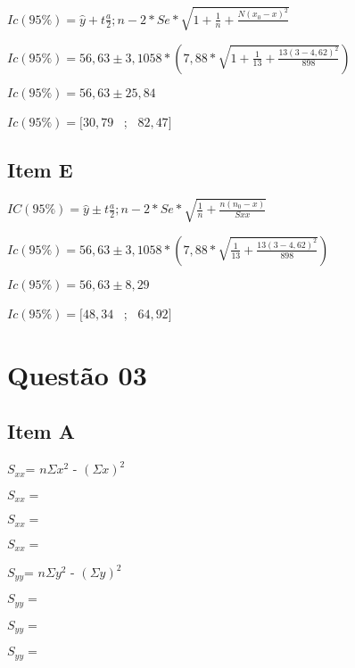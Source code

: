 \documentclass{article}
\begin{document}
            \begin{flushleft}
            $Ic(95\%) = \hat{y} + t\frac{a}{2};n-2 *Se* \sqrt{1 + \frac{1}{n} +\frac{N(x_0 -x)^2}{}}$

            $Ic(95\%) = 56,63 \pm 3,1058 *  (7,88* \sqrt{1 + \frac{1}{13} + \frac{13(3-4,62)^2}{898}})$

            $Ic(95\%) =  56,63 \pm 25,84$

            $Ic(95\%) = [30,79$ \ ; \ $82,47]$
    \end{flushleft}


    \subsection{Item E}

            \begin{flushleft}
            $IC(95\%) = \hat{y} \pm  t \frac{a}{2}; n-2 *Se * \sqrt{\frac{1}{n} + \frac{n(n_0 - x)}{Sxx}}$ 

            $Ic(95\%) = 56,63 \pm 3,1058 *  (7,88* \sqrt{\frac{1}{13} + \frac{13(3-4,62)^2}{898}})$

            $Ic(95\%) =  56,63 \pm 8,29$

            $Ic(95\%) = [48,34$ \ ; \ $64,92]$

            \end{flushleft}


\section{Questão 03}    

    \subsection*{Item A}
        
        \begin{flushleft}

        $S_{xx}$= $n\Sigma x^2$ - $(\Sigma x)^2$ 

        $S_{xx} =$

        $S_{xx} =$

        $S_{xx}=$

        \end{flushleft}

        \begin{flushleft}
            $S_{yy}$= $n\Sigma y^2$ - $(\Sigma y)^2$

            $S_{yy} = $

            $S_{yy} = $

            $S_{yy} = $

        \end{flushleft}
\end{document}

